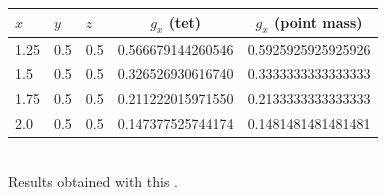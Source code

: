 \begin{center}
\begin{tabular}{lllcc}
\hline
$x$ & $y$ & $z$ & $g_x$ (tet) & $g_x$ (point mass) \\
\hline
\hline
1.25 & 0.5 & 0.5 &  0.566679144260546  & 0.5925925925925926 \\
1.5  & 0.5 & 0.5 &  0.326526930616740  & 0.3333333333333333 \\
1.75 & 0.5 & 0.5 &  0.211222015971550  & 0.2133333333333333 \\
2.0  & 0.5 & 0.5 &  0.147377525744174  & 0.1481481481481481 \\
\hline
\end{tabular}\\
Results obtained with this \stone.
\end{center}

